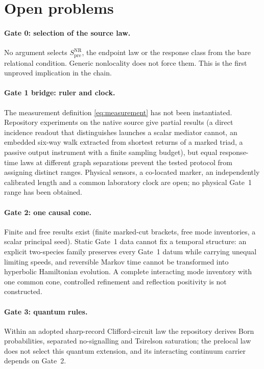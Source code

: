 \documentclass[11pt]{article}
\theoremstyle{definition}
\theoremstyle{remark}
\newcommand{\Spre}{S^{\mathrm{NR}}_{\mathrm{pre}}}
\begin{document}
\section{Open problems}
\label{sec:open}

\paragraph{Gate 0: selection of the source law.} No argument selects
$\Spre$, the endpoint law or the response class from the bare relational condition.
Generic nonlocality does not force them. This is the first unproved implication in the
chain.

\paragraph{Gate 1 bridge: ruler and clock.} The measurement definition
\eqref{eq:measurement} has not been instantiated. Repository experiments on the native
source give partial results (a direct incidence readout that distinguishes launches a
scalar mediator cannot, an embedded six-way walk extracted from shortest returns of a
marked triad, a passive output instrument with a finite sampling budget), but equal
response-time laws at different graph separations prevent the tested protocol from
assigning distinct ranges. Physical sensors, a co-located marker, an independently
calibrated length and a common laboratory clock are open; no physical Gate~1 range has
been obtained.

\paragraph{Gate 2: one causal cone.} Finite and free results exist (finite marked-cut
brackets, free mode inventories, a scalar principal seed). Static Gate~1 data cannot fix
a temporal structure: an explicit two-species family preserves every Gate~1 datum while
carrying unequal limiting speeds, and reversible Markov time cannot be transformed into
hyperbolic Hamiltonian evolution. A complete interacting mode inventory with one common
cone, controlled refinement and reflection positivity is not constructed.

\paragraph{Gate 3: quantum rules.} Within an adopted sharp-record Clifford-circuit law
the repository derives Born probabilities, separated no-signalling and Tsirelson
saturation; the prelocal law does not select this quantum extension, and its interacting
continuum carrier depends on Gate~2.
\end{document}
